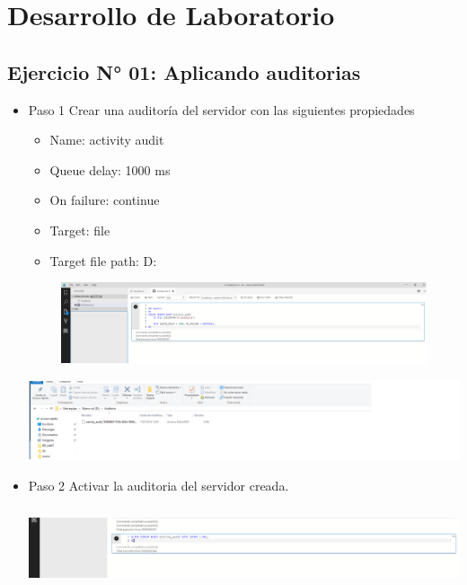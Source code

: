 \section{Desarrollo de Laboratorio}
\subsection{Ejercicio N° 01: Aplicando auditorias}
\begin{itemize}  \item Paso 1 Crear una auditoría del servidor con las siguientes propiedades
\begin{itemize} 
 \item Name: activity audit
 \item Queue delay: 1000 ms
 \item On failure: continue
 \item Target: file
 \item Target file path: D:\Auditoria
\end{itemize}

				 	
					\begin{center}
    				\includegraphics[width=16cm, height=90]{./Imagenes/Imagen1}
   				    \end{center}
   				    
   				    \begin{center}
    				\includegraphics[width=16cm, height=90]{./Imagenes/ImagenAuditoria}
   				    \end{center}
				 

				 \item Paso 2 Activar la auditoria del servidor creada.
				 
				 	\begin{center}
    				\includegraphics[width=16cm, height=90]{./Imagenes/Imagen2}
   				    \end{center}
				 

\end{itemize}

